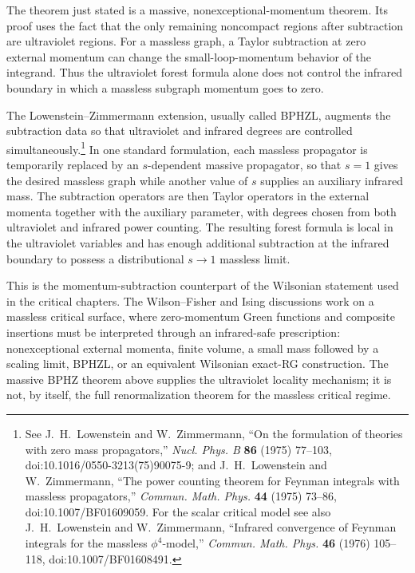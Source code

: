 \begin{remark}
The theorem just stated is a massive, nonexceptional-momentum theorem.  Its
proof uses the fact that the only remaining noncompact regions after
subtraction are ultraviolet regions.  For a massless graph, a Taylor
subtraction at zero external momentum can change the small-loop-momentum
behavior of the integrand.  Thus the ultraviolet forest formula alone does not
control the infrared boundary in which a massless subgraph momentum goes to
zero.

The Lowenstein--Zimmermann extension, usually called BPHZL, augments the
subtraction data so that ultraviolet and infrared degrees are controlled
simultaneously.\footnote{See J.~H.~Lowenstein and W.~Zimmermann, ``On the
formulation of theories with zero mass propagators,'' \emph{Nucl. Phys. B}
\textbf{86} (1975) 77--103, doi:10.1016/0550-3213(75)90075-9; and
J.~H.~Lowenstein and W.~Zimmermann, ``The power counting theorem for Feynman
integrals with massless propagators,'' \emph{Commun. Math. Phys.} \textbf{44}
(1975) 73--86, doi:10.1007/BF01609059.  For the scalar critical model see also
J.~H.~Lowenstein and W.~Zimmermann, ``Infrared convergence of Feynman
integrals for the massless \(\phi^4\)-model,'' \emph{Commun. Math. Phys.}
\textbf{46} (1976) 105--118, doi:10.1007/BF01608491.}
In one standard formulation, each massless propagator is temporarily replaced
by an \(s\)-dependent massive propagator, so that \(s=1\) gives the desired
massless graph while another value of \(s\) supplies an auxiliary infrared
mass.  The subtraction operators are then Taylor operators in the external
momenta together with the auxiliary parameter, with degrees chosen from both
ultraviolet and infrared power counting.  The resulting forest formula is
local in the ultraviolet variables and has enough additional subtraction at
the infrared boundary to possess a distributional \(s\to1\) massless limit.

This is the momentum-subtraction counterpart of the Wilsonian statement used
in the critical chapters.  The Wilson--Fisher and Ising discussions work on a
massless critical surface, where zero-momentum Green functions and composite
insertions must be interpreted through an infrared-safe prescription:
nonexceptional external momenta, finite volume, a small mass followed by a
scaling limit, BPHZL, or an equivalent Wilsonian exact-RG construction.  The
massive BPHZ theorem above supplies the ultraviolet locality mechanism; it is
not, by itself, the full renormalization theorem for the massless critical
regime.
\end{remark}

